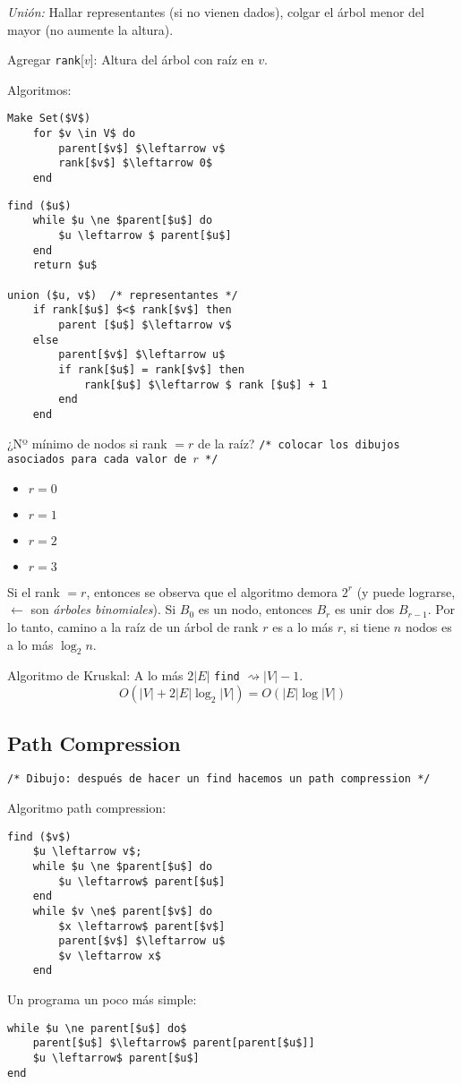 \documentclass[english, spanish, fleqn, 10pt]{article}
\newcommand{\comentarioc}[1]{\texttt{\textcolor{webred}{/* #1 */}}}
\numberwithin{equation}{section}
\newcommand{\nparentesis}[1]{\left( #1 \right)}
\newcommand{\nabsoluto}[1]{\left| #1 \right|}
\theoremstyle{definition}
\begin{document}
\emph{Unión:} Hallar representantes (si no vienen dados), colgar el árbol menor del mayor (no aumente la altura).

Agregar \texttt{rank}[$v$]: Altura del árbol con raíz en $v$.

Algoritmos:
\begin{lstlisting}
Make Set($V$)
	for $v \in V$ do
		parent[$v$] $\leftarrow v$
		rank[$v$] $\leftarrow 0$
	end
\end{lstlisting}

\begin{lstlisting}
find ($u$)
	while $u \ne $parent[$u$] do
		$u \leftarrow $ parent[$u$]
	end
	return $u$
	
union ($u, v$) 	/* representantes */
	if rank[$u$] $<$ rank[$v$] then
		parent [$u$] $\leftarrow v$
	else
		parent[$v$] $\leftarrow u$
		if rank[$u$] = rank[$v$] then
			rank[$u$] $\leftarrow $ rank [$u$] + 1
		end
	end
\end{lstlisting}

¿Nº mínimo de nodos si rank $=r$ de la raíz? \comentarioc{colocar los dibujos asociados para cada valor de $r$}
\begin{itemize}
	\item $r = 0$
	\item $r = 1$
	\item $r = 2$
	\item $r = 3$
\end{itemize}
Si el rank $= r$, entonces se observa que el algoritmo demora $2^r$ (y puede lograrse, $\leftarrow$ son \emph{árboles binomiales}). Si $B_0$ es un nodo, entonces $B_r$ es unir dos $B_{r-1}$. Por lo tanto, camino a la raíz de un árbol de rank $r$ es a lo más $r$, si tiene $n$ nodos es a lo más $\log_2 n$.

Algoritmo de Kruskal: A lo más $2\nabsoluto{E}$ \texttt{find} $\rightsquigarrow \nabsoluto{V} - 1$.
\begin{equation}
O\nparentesis{\nabsoluto{V} + 2\nabsoluto{E}\log _2 \nabsoluto{V}}= O\nparentesis{\nabsoluto{E}\log\nabsoluto{V}}
\end{equation}

\subsection{Path Compression}
\begin{center}
	\comentarioc{Dibujo: después de hacer un find hacemos un path compression}
\end{center}
Algoritmo path compression:
\begin{lstlisting}
find ($v$)
	$u \leftarrow v$;
	while $u \ne $parent[$u$] do
		$u \leftarrow$ parent[$u$]
	end
	while $v \ne$ parent[$v$] do
		$x \leftarrow$ parent[$v$]
		parent[$v$] $\leftarrow u$
		$v \leftarrow x$
	end
\end{lstlisting}
Un programa un poco más simple:
\begin{lstlisting}
while $u \ne parent[$u$] do$
	parent[$u$] $\leftarrow$ parent[parent[$u$]]
	$u \leftarrow$ parent[$u$]
end
\end{lstlisting}
\end{document}
